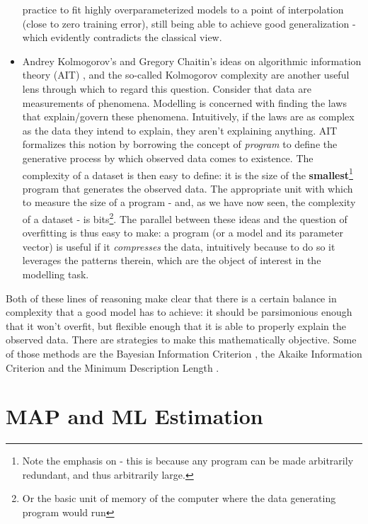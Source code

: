 \begin{itemize}
        practice to fit highly overparameterized models to a point of interpolation
        (close to zero training error), still being able to achieve good generalization -
        which evidently contradicts the classical view.
    \item Andrey Kolmogorov's and Gregory Chaitin's ideas on algorithmic information
        theory (AIT) \autocite{chaitin-leibniz}, and the so-called Kolmogorov complexity  are another
        useful lens through which to regard this question. Consider that data are
        measurements of phenomena. Modelling is concerned with finding the
        laws that explain/govern these phenomena. Intuitively, if the laws are
        as complex as the data they intend to explain, they aren't explaining anything.
        AIT formalizes this notion by borrowing the concept of \emph{program} to
        define the generative process by which observed data comes to existence.
        The complexity of a dataset is then easy to define: it is the size of
        the \textbf{smallest}\footnote{Note the emphasis on  - this is
        because any program can be made arbitrarily redundant, and thus arbitrarily large.}
        program that generates the observed data. The appropriate unit with
        which to measure the size of a program - and, as we have now seen, the
        complexity of a dataset - is bits\footnote{Or the basic unit of memory
        of the computer where the data generating program would run}. The parallel
        between these ideas and the question of overfitting is thus easy to make:
        a program (or a model and its parameter vector)  is useful if it 
        \emph{compresses} the data, intuitively because to do so it leverages the
        patterns therein, which are the object of interest in the modelling task.
\end{itemize}

Both of these lines of reasoning make clear that there is a certain balance
in complexity that a good model has to achieve: it should be parsimonious enough
that it won't overfit, but flexible enough that it is able to properly explain
the observed data.  There are strategies to make this mathematically objective.
Some of those methods are the Bayesian Information Criterion \autocite{bic}, the Akaike
Information Criterion \autocite{aic} and the Minimum Description Length \autocite{Lanterman_2001}.

\section{MAP and ML Estimation}
\label{section:map-mle}

